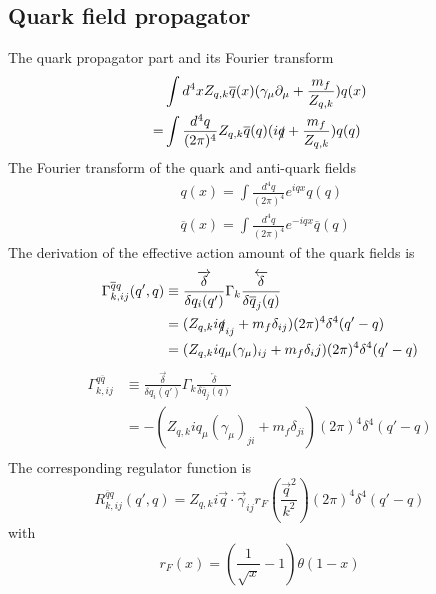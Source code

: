 \documentclass[UTF8]{article}
\begin{document}
\subsection{Quark field propagator}
The quark propagator part and its Fourier transform
\begin{equation}
\begin{split}
&\int d^4x Z_{q,k}\overline{q}(x)(\gamma_\mu\partial_\mu+\frac{m_f}{Z_{q,k}})q(x)\\
=&\int\frac{d^4q}{(2\pi)^4}Z_{q,k}\overline{q}(q)(i\slashed{q}+\frac{m_f}{Z_{q,k}})q(q)
\end{split}
\end{equation}
The Fourier transform of the quark and anti-quark fields 
\begin{equation}
\begin{split}
&q(x)=\int \frac{d^4q}{(2\pi)^4}e^{iqx}q(q) \\
&\overline{q} (x)=\int\frac{d^4q}{(2\pi)^4}e^{-iqx}\overline{q}(q)
\end{split}
\end{equation}
The derivation of the effective action amount of the quark fields is
\begin{equation}
\begin{split}
\Gamma^{\overline{q}q}_{k,ij}(q',q)&\equiv\frac{\overrightarrow{\delta}}{\delta q_i(q')}\Gamma_k\frac{\overleftarrow{\delta}}{\delta\overline{q}_j(q)}\\
&=(Z_{q,k}i\slashed{q}_{ij}+m_f\delta_{ij})(2\pi)^4\delta^4(q'-q)\\
&=(Z_{q,k}iq_\mu(\gamma_\mu)_{ij}+m_f\delta_ij)(2\pi)^4\delta^4(q'-q)
\end{split}
\end{equation}
\begin{equation}
\begin{split}
\Gamma^{q\overline{q}}_{k,ij}&\equiv\frac{\overrightarrow{\delta}}{\delta q_i(q')}\Gamma_k\frac{\overleftarrow{\delta}}{\delta\overline{q}_j(q)}\\
&=-(Z_{q,k}iq_\mu(\gamma_\mu)_{ji}+m_f\delta_{ji})(2\pi)^4\delta^4(q'-q)\\
\end{split}
\end{equation}
The corresponding regulator function is 
\begin{equation}
R^{\overline{q}q}_{k,ij}(q',q)=Z_{q,k}i\vec{q}\cdot\vec{\gamma}_{ij}r_F(\frac{\vec{q}^2}{k^2})(2\pi)^4\delta^4(q'-q)
\end{equation}
with
\begin{equation}
r_F(x)=(\frac{1}{\sqrt{x}}-1)\theta(1-x)
\end{equation}
\end{document}
